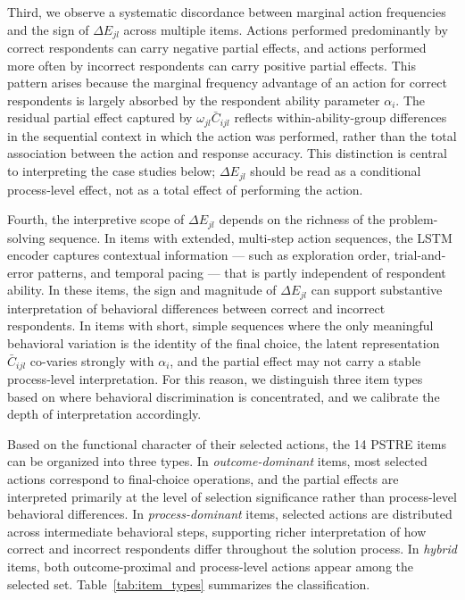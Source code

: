 \documentclass[A4paper,11pt]{article}
\begin{document}
Third, we observe a systematic discordance between marginal action frequencies and the sign of $\Delta E_{jl}$ across multiple items. Actions performed predominantly by correct respondents can carry negative partial effects, and actions performed more often by incorrect respondents can carry positive partial effects. This pattern arises because the marginal frequency advantage of an action for correct respondents is largely absorbed by the respondent ability parameter $\alpha_i$. The residual partial effect captured by $\omega_{jl}\bar{C}_{ijl}$ reflects within-ability-group differences in the sequential context in which the action was performed, rather than the total association between the action and response accuracy. This distinction is central to interpreting the case studies below; $\Delta E_{jl}$ should be read as a conditional process-level effect, not as a total effect of performing the action.

Fourth, the interpretive scope of $\Delta E_{jl}$ depends on the richness of the problem-solving sequence. In items with extended, multi-step action sequences, the LSTM encoder captures contextual information --- such as exploration order, trial-and-error patterns, and temporal pacing --- that is partly independent of respondent ability. In these items, the sign and magnitude of $\Delta E_{jl}$ can support substantive interpretation of behavioral differences between correct and incorrect respondents. In items with short, simple sequences where the only meaningful behavioral variation is the identity of the final choice, the latent representation $\bar{C}_{ijl}$ co-varies strongly with $\alpha_i$, and the partial effect may not carry a stable process-level interpretation. For this reason, we distinguish three item types based on where behavioral discrimination is concentrated, and we calibrate the depth of interpretation accordingly.

Based on the functional character of their selected actions, the 14 PSTRE items can be organized into three types. In \textit{outcome-dominant} items, most selected actions correspond to final-choice operations, and the partial effects are interpreted primarily at the level of selection significance rather than process-level behavioral differences. In \textit{process-dominant} items, selected actions are distributed across intermediate behavioral steps, supporting richer interpretation of how correct and incorrect respondents differ throughout the solution process. In \textit{hybrid} items, both outcome-proximal and process-level actions appear among the selected set. Table~\ref{tab:item_types} summarizes the classification.
\end{document}
